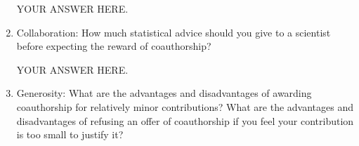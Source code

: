 \documentclass[12pt]{article}
\begin{document}
\begin{enumerate}
YOUR ANSWER HERE.

\item Collaboration: How much statistical advice should you give to a scientist before expecting the reward of coauthorship?

YOUR ANSWER HERE.

\item Generosity: What are the advantages and disadvantages of awarding coauthorship for relatively minor contributions? What are the advantages and disadvantages of refusing an offer of coauthorship if you feel your contribution is too small to justify it?

\end{enumerate}
\end{document}
